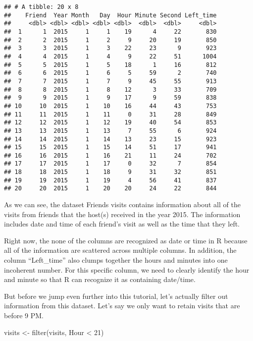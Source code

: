\documentclass[
]{book}
\newenvironment{Shaded}{\begin{snugshade}}{\end{snugshade}}
\newcommand{\DecValTok}[1]{\textcolor[rgb]{0.00,0.00,0.81}{#1}}
\newcommand{\FunctionTok}[1]{\textcolor[rgb]{0.00,0.00,0.00}{#1}}
\newcommand{\NormalTok}[1]{#1}
\newcommand{\OtherTok}[1]{\textcolor[rgb]{0.56,0.35,0.01}{#1}}
\newcommand{\SpecialCharTok}[1]{\textcolor[rgb]{0.00,0.00,0.00}{#1}}
\begin{document}
\begin{verbatim}
## # A tibble: 20 x 8
##    Friend  Year Month   Day  Hour Minute Second Left_time
##     <dbl> <dbl> <dbl> <dbl> <dbl>  <dbl>  <dbl>     <dbl>
##  1      1  2015     1     1    19      4     22       830
##  2      2  2015     1     2     9     20     19       850
##  3      3  2015     1     3    22     23      9       923
##  4      4  2015     1     4     9     22     51      1004
##  5      5  2015     1     5    18      1     16       812
##  6      6  2015     1     6     5     59      2       740
##  7      7  2015     1     7     9     45     55       913
##  8      8  2015     1     8    12      3     33       709
##  9      9  2015     1     9    17      9     59       838
## 10     10  2015     1    10    16     44     43       753
## 11     11  2015     1    11     0     31     28       849
## 12     12  2015     1    12    19     40     54       853
## 13     13  2015     1    13     7     55      6       924
## 14     14  2015     1    14    13     23     15       923
## 15     15  2015     1    15    14     51     17       941
## 16     16  2015     1    16    21     11     24       702
## 17     17  2015     1    17     0     32      7       854
## 18     18  2015     1    18     9     31     32       851
## 19     19  2015     1    19     4     56     41       837
## 20     20  2015     1    20    20     24     22       844
\end{verbatim}

As we can see, the dataset Friends visits contains information about all of the visits from friends that the host(s) received in the year 2015. The information includes date and time of each friend's visit as well as the time that they left.

Right now, the none of the columns are recognized as date or time in R because all of the information are scattered across multiple columns. In addition, the column ``Left\_time'' also clumps together the hours and minutes into one incoherent number. For this specific column, we need to clearly identify the hour and minute so that R can recognize it as containing date/time.

But before we jump even further into this tutorial, let's actually filter out information from this dataset. Let's say we only want to retain visits that are before 9 PM.

\begin{Shaded}
\begin{Highlighting}[]
\NormalTok{visits }\OtherTok{\textless{}{-}} \FunctionTok{filter}\NormalTok{(visits, Hour }\SpecialCharTok{\textless{}} \DecValTok{21}\NormalTok{)}
\end{Highlighting}
\end{Shaded}
\end{document}
